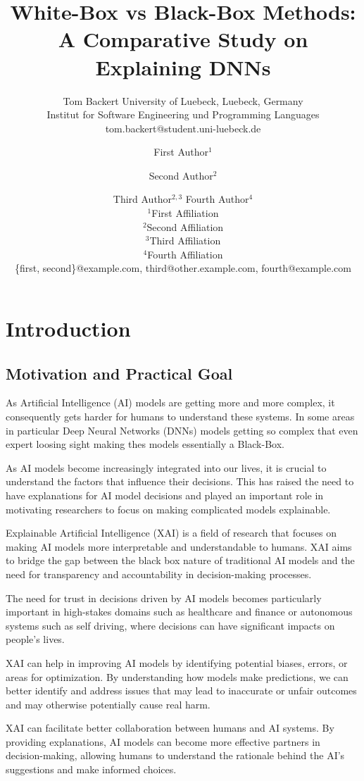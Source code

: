 \documentclass{article}
\title{White-Box vs Black-Box Methods: A Comparative Study on Explaining DNNs}
\author{
    Tom Backert
    \affiliations
    University of Luebeck, Luebeck, Germany\\
    Institut for Software Engineering und Programming Languages
    \emails
    tom.backert@student.uni-luebeck.de
}
\author{
First Author$^1$
\and
Second Author$^2$\and
Third Author$^{2,3}$\And
Fourth Author$^4$\\
\affiliations
$^1$First Affiliation\\
$^2$Second Affiliation\\
$^3$Third Affiliation\\
$^4$Fourth Affiliation\\
\emails
\{first, second\}@example.com,
third@other.example.com,
fourth@example.com
}
\begin{document}
\maketitle

\begin{abstract}
    
\end{abstract}

\section{Introduction}
\subsection{Motivation and Practical Goal}
As Artificial Intelligence (AI) models are getting more and more complex, it consequently gets harder for humans to understand these systems. In some areas in particular Deep Neural Networks (DNNs) models getting so complex that even expert loosing sight making thes models essentially a Black-Box. 

As AI models become increasingly integrated into our lives, it is crucial to understand the factors that influence their  decisions. This has raised the need to have explanations for AI model decisions and played an important role in motivating researchers to focus on making complicated models explainable.

Explainable Artificial Intelligence (XAI) is a field of research that focuses on making AI models more interpretable and understandable to humans.  XAI aims to bridge the gap between the black box nature of traditional AI models and the need for transparency and accountability in decision-making processes. 

The need for trust in decisions driven by AI models becomes particularly important in high-stakes domains such as healthcare and finance or autonomous systems such as self driving, where decisions can have significant impacts on people's lives.

XAI can help in improving AI models by identifying potential biases, errors, or areas for optimization. By understanding how models make predictions, we can better identify and address issues that may lead to inaccurate or unfair outcomes and may otherwise potentially cause real harm.

XAI can facilitate better collaboration between humans and AI systems. By providing explanations, AI models can become more effective partners in decision-making, allowing humans to understand the rationale behind the AI's suggestions and make informed choices.
\end{document}
